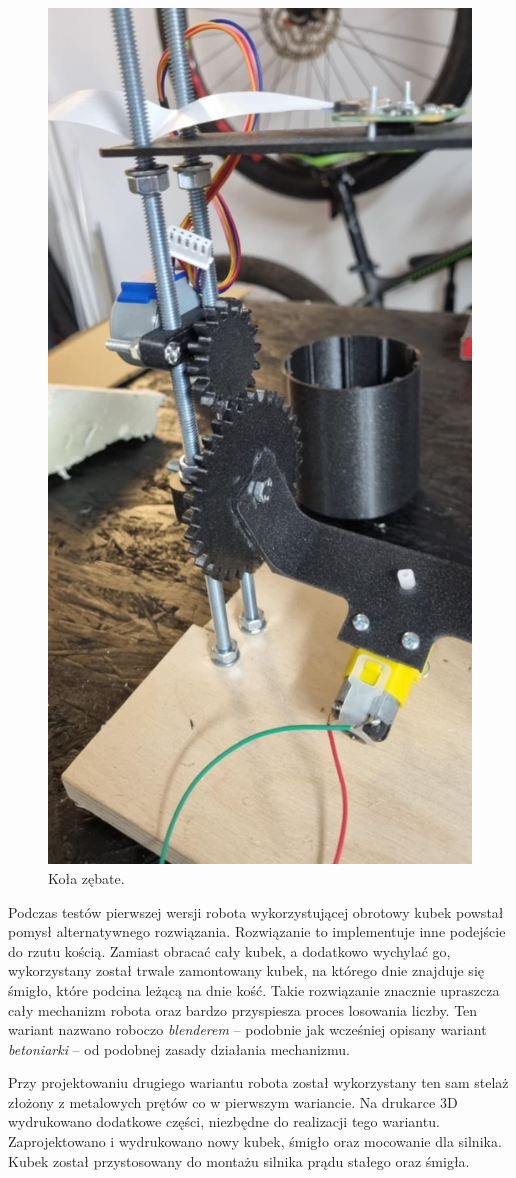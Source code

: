 \begin{figure}[H]
    \centering
    \includegraphics[width=0.25\linewidth, trim={65mm 75mm 0mm 180mm}, clip]{chapters/03-praca-wlasna/figures/koła_zębowe}
    \caption{\label{fig:zebatki}Koła zębate.}
\end{figure}

Podczas testów pierwszej wersji robota wykorzystującej obrotowy kubek powstał pomysł alternatywnego rozwiązania.
Rozwiązanie to implementuje inne podejście do rzutu kością. Zamiast obracać cały kubek, a dodatkowo wychylać go,
wykorzystany został trwale zamontowany kubek, na którego dnie znajduje się śmigło, które podcina leżącą na dnie kość.
Takie rozwiązanie znacznie upraszcza cały mechanizm robota oraz bardzo przyspiesza proces losowania liczby. Ten wariant 
nazwano roboczo \textit{blenderem} -- podobnie jak wcześniej opisany wariant \textit{betoniarki} -- od podobnej zasady działania mechanizmu.

Przy projektowaniu drugiego wariantu robota został wykorzystany ten sam stelaż złożony z metalowych prętów co w 
pierwszym wariancie. Na drukarce 3D wydrukowano dodatkowe części, niezbędne do realizacji tego wariantu.
Zaprojektowano i wydrukowano nowy kubek, śmigło oraz mocowanie dla silnika. Kubek został przystosowany do montażu 
silnika prądu stałego oraz śmigła.

